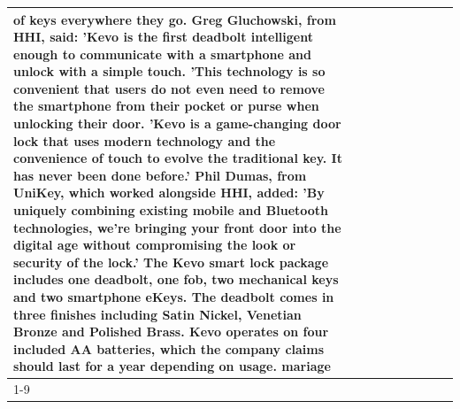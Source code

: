 \begin{table}[H]
\begin{tabular}{lllrlllll}
of keys everywhere they go. Greg Gluchowski, from HHI, said: 'Kevo is the first deadbolt intelligent enough to communicate with a smartphone and unlock with a simple touch. 'This technology is so convenient that users do not even need to remove the smartphone from their pocket or purse when unlocking their door. 'Kevo is a game-changing door lock that uses modern technology and the convenience of touch to evolve the traditional key. It has never been done before.' Phil Dumas, from UniKey, which worked alongside HHI, added: 'By uniquely combining existing mobile and Bluetooth technologies, we’re bringing your front door into the digital age without compromising the look or security of the lock.' The Kevo smart lock package includes one deadbolt, one fob, two mechanical keys and two smartphone eKeys. The deadbolt comes in three finishes including Satin Nickel, Venetian Bronze and Polished Brass. Kevo operates on four included AA batteries, which the company claims should last for a year depending on usage. mariage \\
\cline{1-9}

\end{tabular}
\end{table}
